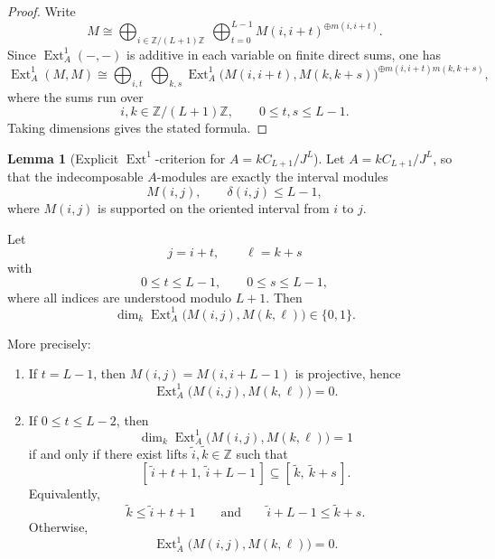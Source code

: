 \documentclass{article}
\newcommand{\Ext}{\operatorname{Ext}}
\theoremstyle{definition}
\newtheorem{lemma}[theorem]{Lemma}
\begin{document}
\begin{proof}
Write
\[
M\cong
\bigoplus_{i\in \mathbb{Z}/(L+1)\mathbb{Z}}
\ \bigoplus_{t=0}^{L-1}
M(i,i+t)^{\oplus m(i,i+t)}.
\]
Since $\Ext_A^1(-,-)$ is additive in each variable on finite direct sums, one has
\[
\Ext_A^1(M,M)
\cong
\bigoplus_{i,t}\ \bigoplus_{k,s}
\Ext_A^1\!\big(M(i,i+t),M(k,k+s)\big)^{\oplus m(i,i+t)m(k,k+s)},
\]
where the sums run over
\[
i,k\in \mathbb{Z}/(L+1)\mathbb{Z},
\qquad
0\le t,s\le L-1.
\]
Taking dimensions gives the stated formula.
\end{proof}
\begin{lemma}[Explicit $\Ext^1$-criterion for $A=kC_{L+1}/J^{L}$]\label{lem:ext1_criterion_cycle}
Let $A=kC_{L+1}/J^{L}$, so that the indecomposable $A$-modules are exactly the interval modules
\[
M(i,j),\qquad \delta(i,j)\le L-1,
\]
where $M(i,j)$ is supported on the oriented interval from $i$ to $j$.

Let
\[
j=i+t,\qquad \ell=k+s
\]
with
\[
0\le t\le L-1,\qquad 0\le s\le L-1,
\]
where all indices are understood modulo $L+1$. Then
\[
\dim_k\Ext_A^1\!\big(M(i,j),M(k,\ell)\big)\in\{0,1\}.
\]

More precisely:

\begin{enumerate}
    \item If $t=L-1$, then $M(i,j)=M(i,i+L-1)$ is projective, hence
    \[
    \Ext_A^1\!\big(M(i,j),M(k,\ell)\big)=0.
    \]

    \item If $0\le t\le L-2$, then
    \[
    \dim_k\Ext_A^1\!\big(M(i,j),M(k,\ell)\big)=1
    \]
    if and only if there exist lifts $\tilde i,\tilde k\in\mathbb Z$ such that
    \[
    [\,\tilde i+t+1,\ \tilde i+L-1\,]\subseteq [\,\tilde k,\ \tilde k+s\,].
    \]
    Equivalently,
    \[
    \tilde k\le \tilde i+t+1
    \qquad\text{and}\qquad
    \tilde i+L-1\le \tilde k+s.
    \]
    Otherwise,
    \[
    \Ext_A^1\!\big(M(i,j),M(k,\ell)\big)=0.
    \]
\end{enumerate}
\end{lemma}
\end{document}
